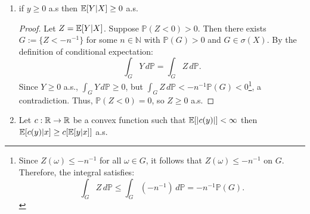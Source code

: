 \documentclass{article}
\begin{document}
\begin{enumerate}
\begin{proof}
        Using the linearity of the integral, this can be expressed as:
        \[
        \int_A (a_1 Y_1 + a_2 Y_2) \, d\mathbb{P} = \int_A a_1 Y_1 \, d\mathbb{P} + \int_A a_2 Y_2 \, d\mathbb{P}.
        \]
        
        Taking the constants \(a_1\) and \(a_2\) outside their respective integrals, we get:
        \[
        \E[a_1 Y_1 + a_2 Y_2 | X] = a_1 \int_A Y_1 \, d\mathbb{P} + a_2 \int_A Y_2 \, d\mathbb{P}.
        \]
        
        By the definition of conditional expectation, this becomes:
        \[
        \E[a_1 Y_1 + a_2 Y_2 | X] = a_1 \E[Y_1 | X] + a_2 \E[Y_2 | X].
        \]
        
        Thus, the result follows:
        \[
        \E[a_1 Y_1 + a_2 Y_2 | X] = a_1 \E[Y_1 | X] + a_2 \E[Y_2 | X] \quad \text{a.s.}
        \]
        \end{proof}
        




    \item if \(y\geq 0\) a.s then \(\mathbb{E}[Y|X]\geq0\) a.s.
    
    \begin{proof}
        Let \(Z = \mathbb{E}[Y | X]\). Suppose \(\mathbb{P}(Z < 0) > 0\). Then there exists \(G := \{Z < -n^{-1}\}\) for some \(n \in \mathbb{N}\) with \(\mathbb{P}(G) > 0\) and \(G \in \sigma(X)\). By the definition of conditional expectation:
        \[
        \int_G Y \, d\mathbb{P} = \int_G Z \, d\mathbb{P}.
        \]
        Since \(Y \geq 0\) a.s., \(\int_G Y \, d\mathbb{P} \geq 0\), but \(\int_G Z \, d\mathbb{P} < -n^{-1} \mathbb{P}(G) < 0\)\footnote{Since \(Z(\omega) \leq -n^{-1}\) for all \(\omega \in G\), it follows that \(Z(\omega) \leq -n^{-1}\) on \(G\). Therefore, the integral satisfies:
        \[
        \int_G Z \, d\mathbb{P} \leq \int_G (-n^{-1}) \, d\mathbb{P} = -n^{-1} \mathbb{P}(G).
        \]}, a contradiction. Thus, \(\mathbb{P}(Z < 0) = 0\), so \(Z \geq 0\) a.s.
        \end{proof}
        
        



    \item Let \(c:\mathbb{R}\rightarrow \mathbb{R}\) be a convex function such that \(\mathbb{E}[|c(y)|]<\infty\) then \(\mathbb{E}[c(y)|x]\geq c[\mathbb{E}[y|x]]\) a.s.
    

\end{enumerate}
\end{document}
